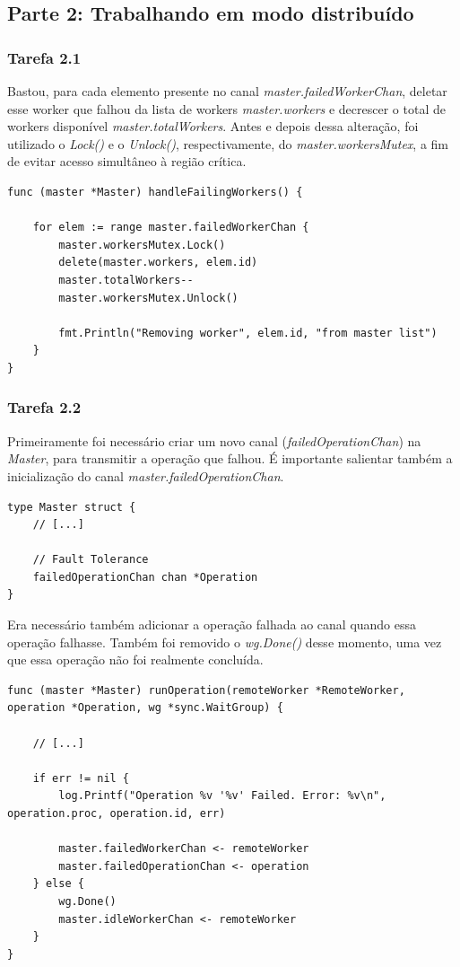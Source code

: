 \documentclass[conference]{IEEEtran}
\begin{document}
\subsection{Parte 2: Trabalhando em modo distribuído}

\subsubsection{Tarefa 2.1} Bastou, para cada elemento presente no canal \textit{master.failedWorkerChan}, deletar esse worker que falhou da lista de workers \textit{master.workers} e decrescer o total de workers disponível \textit{master.totalWorkers}. Antes e depois dessa alteração, foi utilizado o \textit{Lock()} e o \textit{Unlock()}, respectivamente, do \textit{master.workersMutex}, a fim de evitar acesso simultâneo à região crítica.

\begin{lstlisting}
func (master *Master) handleFailingWorkers() {

	for elem := range master.failedWorkerChan {
		master.workersMutex.Lock()
		delete(master.workers, elem.id)
		master.totalWorkers--
		master.workersMutex.Unlock()

		fmt.Println("Removing worker", elem.id, "from master list")
	}
}
\end{lstlisting}

\subsubsection{Tarefa 2.2} Primeiramente foi necessário criar um novo canal (\textit{failedOperationChan}) na \textit{Master}, para transmitir a operação que falhou. É importante salientar também a inicialização do canal \textit{master.failedOperationChan}.

\begin{lstlisting}
type Master struct {
	// [...]

	// Fault Tolerance
	failedOperationChan chan *Operation
}
\end{lstlisting}

Era necessário também adicionar a operação falhada ao canal quando essa operação falhasse. Também foi removido o \textit{wg.Done()} desse momento, uma vez que essa operação não foi realmente concluída.

\begin{lstlisting}
func (master *Master) runOperation(remoteWorker *RemoteWorker, operation *Operation, wg *sync.WaitGroup) {

	// [...]

	if err != nil {
		log.Printf("Operation %v '%v' Failed. Error: %v\n", operation.proc, operation.id, err)
		
		master.failedWorkerChan <- remoteWorker
		master.failedOperationChan <- operation
	} else {
		wg.Done()
		master.idleWorkerChan <- remoteWorker
	}
}
\end{lstlisting}
\end{document}

